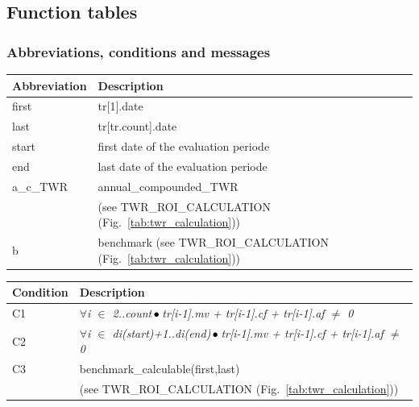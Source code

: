\documentclass[runningheads,12pt]{article}
\begin{document}




\newpage

\subsection{Function tables}




\subsubsection{Abbreviations, conditions and messages}
{\centering
\begin{longtable}{|l|p{11cm}|}
\hline
\textbf{Abbreviation} & \textbf{Description}\\

\hline
first & tr[1].date \\

\hline
last & tr[tr.count].date\\

\hline
start & first date of the evaluation periode \\

\hline
end & last date of the evaluation periode \\

\hline
 a\_c\_TWR & annual\_compounded\_TWR\\
& (see TWR\_ROI\_CALCULATION (Fig.~\ref{tab:twr_calculation})) \\

\hline
 b & benchmark (see TWR\_ROI\_CALCULATION (Fig.~\ref{tab:twr_calculation}))\\



\hline
\end{longtable}

\centering
\begin{longtable}{|l|p{12cm}|}
\hline
\textbf{Condition} & \textbf{Description}\\

\hline
C1 & \textit{$\forall$i $\in$ 2..count$\,\bullet\,$tr[i-1].mv + tr[i-1].cf + tr[i-1].af $\neq$ 0}\\

\hline
C2 & \textit{$\forall$i $\in$ di(start)+1..di(end)$\,\bullet\,$tr[i-1].mv + tr[i-1].cf + tr[i-1].af $\neq$ 0}\\

\hline
C3 & benchmark\_calculable(first,last)\\
& (see TWR\_ROI\_CALCULATION (Fig.~\ref{tab:twr_calculation}))\\


\end{longtable}}
\end{document}

